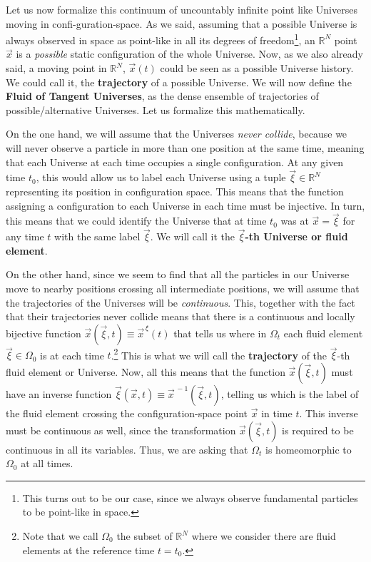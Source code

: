 \documentclass[11pt, a4paper]{article} %
\newcommand{\R}{\mathbb{R}} %
\begin{document}
Let us now formalize this continuum of uncountably infinite point like Universes moving in confi-guration-space. As we said, assuming that a possible Universe is always observed in space as point-like in all its degrees of freedom\footnote{This turns out to be our case, since we always observe fundamental particles to be point-like in space.}, an $\R^N$ point $\vec{x}$ is a {\em possible} static configuration of the whole Universe. Now, as we also already said, a moving point in $\R^N$, $\vec{x}(t)$ could be seen as a possible Universe history. We could call it, the {\bf trajectory} of a possible Universe. We will now define the {\bf Fluid of Tangent Universes}, as the dense ensemble of trajectories of possible/alternative Universes. Let us formalize this mathematically.

On the one hand, we will assume that the Universes {\em never collide}, because we will never observe a particle in more than one position at the same time, meaning that each Universe at each time occupies a single configuration. At any given time $t_0$, this would allow us to label each Universe using a tuple $\vec{\xi}\in\R^N$ representing its position in configuration space. This means that the function assigning a configuration to each Universe in each time must be injective. In turn, this means that we could identify the Universe that at time $t_0$ was at $\vec{x}=\vec{\xi}$ for any time $t$ with the same label $\vec{\xi}$. We will call it the {\bf $\vec{\xi}$-th Universe or fluid element}. 


On the other hand, since we seem to find that all the particles in our Universe move to nearby positions crossing all intermediate positions, we will assume that the trajectories of the Universes will be {\em continuous}. This, together with the fact that their trajectories never collide means that there is a continuous and locally bijective function $\vec{x}(\vec{\xi},t)\equiv \vec{x}^{\, \xi}(t)$ that tells us where in $\Omega_t$ each fluid element $\vec{\xi}\in\Omega_0$ is at each time $t$.\footnote{Note that we call $\Omega_0$ the subset of $\R^N$ where we consider there are fluid elements at the reference time $t=t_0$. } This is what we will call the {\bf trajectory} of the $\vec{\xi}$-th fluid element or Universe. Now, all this means that the function $\vec{x}(\vec{\xi},t)$ must have an inverse function $\vec{\xi}(\vec{x},t)\equiv \vec{x}^{\, -1}(\vec{\xi},t)$, telling us which is the label of the fluid element crossing the configuration-space point $\vec{x}$ in time $t$. This inverse must be continuous as well, since the transformation $\vec{x}(\vec{\xi},t)$ is required to be continuous in all its variables. Thus, we are asking that $\Omega_t$ is homeomorphic to $\Omega_0$ at all times.
\end{document}
